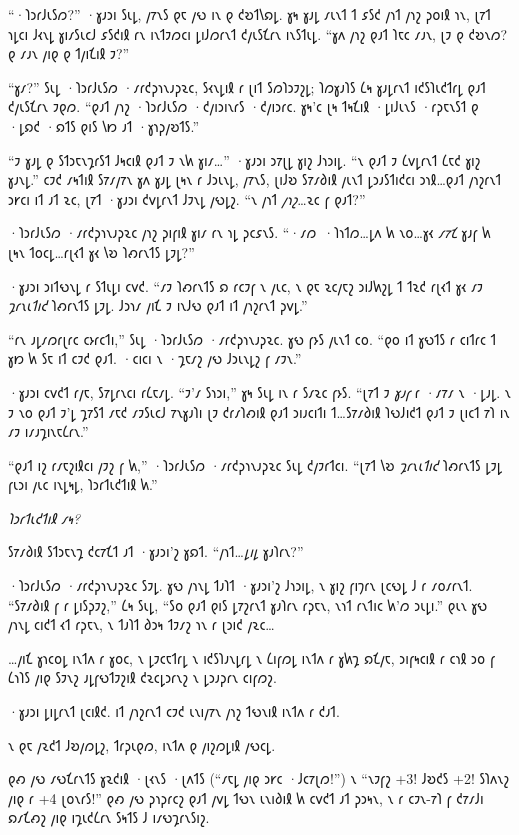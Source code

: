“·𐑐𐑮𐑩𐑓𐑧𐑕𐑼?” ·𐑣𐑨𐑮𐑦 𐑕𐑧𐑛, 𐑢𐑳𐑯𐑕 𐑞𐑱 𐑢𐑻 𐑦𐑯 𐑞 𐑒𐑹𐑑𐑘𐑸𐑛. 𐑣𐑰 𐑣𐑨𐑛 𐑥𐑧𐑯𐑑 𐑑 𐑭𐑕𐑒 𐑢𐑪𐑑 𐑢𐑪𐑟 𐑜𐑴𐑦𐑙 𐑪𐑯, 𐑚𐑳𐑑 𐑪𐑛𐑤𐑦 𐑓𐑬𐑯𐑛 𐑣𐑦𐑥𐑕𐑧𐑤𐑓 𐑭𐑕𐑒𐑦𐑙 𐑩𐑯 𐑦𐑯𐑑𐑲𐑼𐑤𐑦 𐑛𐑦𐑓𐑼𐑩𐑯𐑑 𐑒𐑢𐑧𐑕𐑗𐑩𐑯 𐑦𐑯𐑕𐑑𐑧𐑛. “𐑣𐑵 𐑢𐑪𐑟 𐑞𐑨𐑑 𐑐𐑱𐑤 𐑥𐑨𐑯, 𐑚𐑲 𐑞 𐑒𐑹𐑯𐑼? 𐑞 𐑥𐑨𐑯 𐑢𐑦𐑞 𐑞 𐑑𐑢𐑦𐑗𐑦𐑙 𐑲?”

“𐑣𐑥?” 𐑕𐑧𐑛 ·𐑐𐑮𐑩𐑓𐑧𐑕𐑼 ·𐑥𐑩𐑒𐑜𐑪𐑯𐑨𐑜𐑷𐑤, 𐑕𐑬𐑯𐑛𐑦𐑙 𐑩 𐑚𐑦𐑑 𐑕𐑼𐑐𐑮𐑲𐑟𐑛; 𐑐𐑼𐑣𐑨𐑐𐑕 𐑖𐑰 𐑣𐑨𐑛𐑩𐑯𐑑 𐑦𐑒𐑕𐑐𐑧𐑒𐑑𐑩𐑛 𐑞𐑨𐑑 𐑒𐑢𐑧𐑕𐑗𐑩𐑯 𐑲𐑞𐑼. “𐑞𐑨𐑑 𐑢𐑪𐑟 ·𐑐𐑮𐑩𐑓𐑧𐑕𐑼 ·𐑒𐑢𐑦𐑮𐑦𐑯𐑩𐑕 ·𐑒𐑢𐑦𐑮𐑩𐑤. 𐑣𐑰'𐑤 𐑚𐑰 𐑑𐑰𐑗𐑦𐑙 ·𐑛𐑦𐑓𐑧𐑯𐑕 ·𐑩𐑜𐑱𐑯𐑕𐑑 𐑞 ·𐑛𐑸𐑒 ·𐑸𐑑𐑕 𐑞𐑦𐑕 𐑘𐑽 𐑨𐑑 ·𐑣𐑪𐑜𐑢𐑹𐑑𐑕.”

“𐑲 𐑣𐑨𐑛 𐑞 𐑕𐑑𐑮𐑱𐑯𐑡𐑩𐑕𐑑 𐑓𐑰𐑤𐑦𐑙 𐑞𐑨𐑑 𐑲 𐑯𐑿 𐑣𐑦𐑥…” ·𐑣𐑨𐑮𐑦 𐑮𐑳𐑚𐑛 𐑣𐑦𐑟 𐑓𐑪𐑮𐑦𐑛. “𐑯 𐑞𐑨𐑑 𐑲 𐑖𐑫𐑛𐑩𐑯𐑑 𐑖𐑱𐑒 𐑣𐑦𐑟 𐑣𐑨𐑯𐑛.” 𐑤𐑲𐑒 𐑥𐑰𐑑𐑦𐑙 𐑕𐑳𐑥𐑢𐑳𐑯 𐑣𐑵 𐑣𐑨𐑛 𐑚𐑰𐑯 𐑩 𐑓𐑮𐑧𐑯𐑛, 𐑢𐑳𐑯𐑕, 𐑚𐑦𐑓𐑹 𐑕𐑳𐑥𐑔𐑦𐑙 𐑢𐑧𐑯𐑑 𐑛𐑮𐑨𐑕𐑑𐑦𐑒𐑤𐑦 𐑮𐑪𐑙…𐑞𐑨𐑑 𐑢𐑪𐑟𐑩𐑯𐑑 𐑮𐑾𐑤𐑦 𐑦𐑑 𐑨𐑑 𐑷𐑤, 𐑚𐑳𐑑 ·𐑣𐑨𐑮𐑦 𐑒𐑫𐑛𐑩𐑯𐑑 𐑓𐑲𐑯𐑛 𐑢𐑻𐑛𐑟. “𐑯 𐑢𐑪𐑑 \emph{𐑢𐑪𐑟}…𐑷𐑤 𐑝 𐑞𐑨𐑑?”

·𐑐𐑮𐑩𐑓𐑧𐑕𐑼 ·𐑥𐑩𐑒𐑜𐑪𐑯𐑨𐑜𐑷𐑤 𐑢𐑪𐑟 𐑜𐑦𐑝𐑦𐑙 𐑣𐑦𐑥 𐑩𐑯 𐑪𐑛 𐑜𐑤𐑭𐑯𐑕. “·𐑥𐑼~·𐑐𐑪𐑑𐑼…𐑛𐑵 𐑿 𐑯𐑴…𐑣𐑬 \emph{𐑥𐑳𐑗} 𐑣𐑨𐑝 𐑿 𐑚𐑰𐑯 𐑑𐑴𐑤𐑛…𐑩𐑚𐑬𐑑 𐑣𐑬 𐑘𐑹 𐑐𐑺𐑩𐑯𐑑𐑕 𐑛𐑲𐑛?”

·𐑣𐑨𐑮𐑦 𐑮𐑦𐑑𐑻𐑯𐑛 𐑩 𐑕𐑑𐑧𐑛𐑦 𐑤𐑫𐑒. “𐑥𐑲 𐑐𐑺𐑩𐑯𐑑𐑕 𐑸 𐑩𐑤𐑲𐑝 𐑯 𐑢𐑧𐑤, 𐑯 𐑞𐑱 𐑷𐑤𐑢𐑱𐑟 𐑮𐑦𐑓𐑿𐑟𐑛 𐑑 𐑑𐑷𐑒 𐑩𐑚𐑬𐑑 𐑣𐑬 𐑥𐑲 \emph{𐑡𐑩𐑯𐑧𐑑𐑦𐑒} 𐑐𐑺𐑩𐑯𐑑𐑕 𐑛𐑲𐑛. 𐑓𐑮𐑪𐑥 𐑢𐑦𐑗 𐑲 𐑦𐑯𐑓𐑻 𐑞𐑨𐑑 𐑦𐑑 𐑢𐑪𐑟𐑩𐑯𐑑 𐑜𐑫𐑛.”

“𐑩𐑯 𐑨𐑛𐑥𐑼𐑩𐑚𐑩𐑤 𐑤𐑶𐑩𐑤𐑑𐑦,” 𐑕𐑧𐑛 ·𐑐𐑮𐑩𐑓𐑧𐑕𐑼 ·𐑥𐑩𐑒𐑜𐑪𐑯𐑨𐑜𐑷𐑤. 𐑣𐑻 𐑝𐑶𐑕 𐑢𐑧𐑯𐑑 𐑤𐑴. “𐑞𐑴 𐑦𐑑 𐑣𐑻𐑑𐑕 𐑩 𐑤𐑦𐑑𐑩𐑤 𐑑 𐑣𐑽 𐑿 𐑕𐑱 𐑦𐑑 𐑤𐑲𐑒 𐑞𐑨𐑑. ·𐑤𐑦𐑤𐑦 𐑯 ·𐑡𐑱𐑥𐑟 𐑢𐑻 𐑓𐑮𐑧𐑯𐑛𐑟 𐑝 𐑥𐑲𐑯.”

·𐑣𐑨𐑮𐑦 𐑤𐑫𐑒𐑑 𐑩𐑢𐑱, 𐑕𐑳𐑛𐑩𐑯𐑤𐑦 𐑩𐑖𐑱𐑥𐑛. “𐑲'𐑥 𐑕𐑪𐑮𐑦,” 𐑣𐑰 𐑕𐑧𐑛 𐑦𐑯 𐑩 𐑕𐑥𐑷𐑤 𐑝𐑶𐑕. “𐑚𐑳𐑑 𐑲 \emph{𐑣𐑨𐑝} 𐑩 ·𐑥𐑳𐑥 𐑯 ·𐑛𐑨𐑛. 𐑯 𐑲 𐑯𐑴 𐑞𐑨𐑑 𐑲'𐑛 𐑡𐑳𐑕𐑑 𐑥𐑱𐑒 𐑥𐑲𐑕𐑧𐑤𐑓 𐑳𐑯𐑣𐑨𐑐𐑦 𐑚𐑲 𐑒𐑩𐑥𐑐𐑺𐑦𐑙 𐑞𐑨𐑑 𐑮𐑦𐑨𐑤𐑦𐑑𐑦 𐑑…𐑕𐑳𐑥𐑔𐑦𐑙 𐑐𐑻𐑓𐑦𐑒𐑑 𐑞𐑨𐑑 𐑲 𐑚𐑦𐑤𐑑 𐑳𐑐 𐑦𐑯 𐑥𐑲 𐑦𐑥𐑨𐑡𐑦𐑯𐑱𐑖𐑩𐑯.”

“𐑞𐑨𐑑 𐑦𐑟 𐑩𐑥𐑱𐑟𐑦𐑙𐑤𐑦 𐑢𐑲𐑟 𐑝 𐑿,” ·𐑐𐑮𐑩𐑓𐑧𐑕𐑼 ·𐑥𐑩𐑒𐑜𐑪𐑯𐑨𐑜𐑷𐑤 𐑕𐑧𐑛 𐑒𐑢𐑲𐑩𐑑𐑤𐑦. “𐑚𐑳𐑑 𐑘𐑹 \emph{𐑡𐑩𐑯𐑧𐑑𐑦𐑒} 𐑐𐑺𐑩𐑯𐑑𐑕 𐑛𐑲𐑛 𐑝𐑧𐑮𐑦 𐑢𐑧𐑤 𐑦𐑯𐑛𐑰𐑛, 𐑐𐑮𐑩𐑑𐑧𐑒𐑑𐑦𐑙 𐑿.”

\emph{𐑐𐑮𐑩𐑑𐑧𐑒𐑑𐑦𐑙 𐑥𐑰?}

𐑕𐑳𐑥𐑔𐑦𐑙 𐑕𐑑𐑮𐑱𐑯𐑡 𐑒𐑤𐑳𐑗𐑑 𐑨𐑑 ·𐑣𐑨𐑮𐑦'𐑟 𐑣𐑸𐑑. “𐑢𐑪𐑑…\emph{𐑛𐑦𐑛} 𐑣𐑨𐑐𐑩𐑯?”

·𐑐𐑮𐑩𐑓𐑧𐑕𐑼 ·𐑥𐑩𐑒𐑜𐑪𐑯𐑨𐑜𐑷𐑤 𐑕𐑲𐑛. 𐑣𐑻 𐑢𐑪𐑯𐑛 𐑑𐑨𐑐𐑑 ·𐑣𐑨𐑮𐑦'𐑟 𐑓𐑪𐑮𐑦𐑛, 𐑯 𐑣𐑦𐑟 𐑝𐑦𐑠𐑩𐑯 𐑚𐑤𐑻𐑛 𐑓 𐑩 𐑥𐑴𐑥𐑩𐑯𐑑. “𐑕𐑳𐑥𐑔𐑦𐑙 𐑝 𐑩 𐑛𐑦𐑕𐑜𐑲𐑟,” 𐑖𐑰 𐑕𐑧𐑛, “𐑕𐑴 𐑞𐑨𐑑 𐑞𐑦𐑕 𐑛𐑳𐑟𐑩𐑯𐑑 𐑣𐑨𐑐𐑩𐑯 𐑩𐑜𐑱𐑯, 𐑯𐑪𐑑 𐑩𐑯𐑑𐑦𐑤 𐑿'𐑼 𐑮𐑧𐑛𐑦.” 𐑞𐑧𐑯 𐑣𐑻 𐑢𐑪𐑯𐑛 𐑤𐑦𐑒𐑑 𐑬𐑑 𐑩𐑜𐑱𐑯, 𐑯 𐑑𐑨𐑐𐑑 𐑔𐑮𐑰 𐑑𐑲𐑥𐑟 𐑪𐑯 𐑩 𐑚𐑮𐑦𐑒 𐑢𐑷𐑤…

…𐑢𐑦𐑗 𐑣𐑪𐑤𐑴𐑛 𐑦𐑯𐑑𐑵 𐑩 𐑣𐑴𐑤, 𐑯 𐑛𐑲𐑤𐑱𐑑𐑩𐑛 𐑯 𐑦𐑒𐑕𐑐𐑨𐑯𐑛𐑩𐑛 𐑯 𐑖𐑦𐑝𐑼𐑛 𐑦𐑯𐑑𐑵 𐑩 𐑣𐑿𐑡 𐑸𐑗𐑢𐑱, 𐑮𐑦𐑝𐑰𐑤𐑦𐑙 𐑩 𐑤𐑪𐑙 𐑮𐑴 𐑝 𐑖𐑪𐑐𐑕 𐑢𐑦𐑞 𐑕𐑲𐑯𐑟 𐑨𐑛𐑝𐑻𐑑𐑲𐑟𐑦𐑙 𐑒𐑷𐑤𐑛𐑮𐑩𐑯𐑟 𐑯 𐑛𐑮𐑨𐑜𐑩𐑯 𐑤𐑦𐑝𐑼𐑟.

·𐑣𐑨𐑮𐑦 𐑛𐑦𐑛𐑩𐑯𐑑 𐑚𐑤𐑦𐑙𐑒. 𐑦𐑑 𐑢𐑪𐑟𐑩𐑯𐑑 𐑤𐑲𐑒 𐑧𐑯𐑦𐑢𐑳𐑯 𐑢𐑪𐑟 𐑑𐑻𐑯𐑦𐑙 𐑦𐑯𐑑𐑵 𐑩 𐑒𐑨𐑑.

𐑯 𐑞𐑱 𐑢𐑷𐑒𐑑 𐑓𐑹𐑢𐑼𐑛𐑟, 𐑑𐑩𐑜𐑧𐑞𐑼, 𐑦𐑯𐑑𐑵 𐑞 𐑢𐑦𐑟𐑼𐑛𐑦𐑙 𐑢𐑻𐑤𐑛.

𐑞𐑺 𐑢𐑻 𐑥𐑻𐑗𐑩𐑯𐑑𐑕 𐑣𐑷𐑒𐑦𐑙 ·𐑚𐑬𐑯𐑕 ·𐑚𐑵𐑑𐑕 (“𐑥𐑱𐑛 𐑢𐑦𐑞 𐑮𐑾𐑤 ·𐑓𐑤𐑳𐑚𐑼!”) 𐑯 “𐑯𐑲𐑝𐑟 +3! 𐑓𐑹𐑒𐑕 +2! 𐑕𐑐𐑵𐑯𐑟 𐑢𐑦𐑞 𐑩 +4 𐑚𐑴𐑯𐑩𐑕!” 𐑞𐑺 𐑢𐑻 𐑜𐑪𐑜𐑩𐑤𐑟 𐑞𐑨𐑑 𐑢𐑫𐑛 𐑑𐑻𐑯 𐑧𐑯𐑦𐑔𐑦𐑙 𐑿 𐑤𐑫𐑒𐑑 𐑨𐑑 𐑜𐑮𐑰𐑯, 𐑯 𐑩 𐑤𐑲𐑯-𐑳𐑐 𐑝 𐑒𐑳𐑥𐑓𐑦 𐑸𐑥𐑗𐑺𐑟 𐑢𐑦𐑞 𐑦𐑡𐑧𐑒𐑖𐑩𐑯 𐑕𐑰𐑑𐑕 𐑓 𐑦𐑥𐑻𐑡𐑩𐑯𐑕𐑦𐑟.


